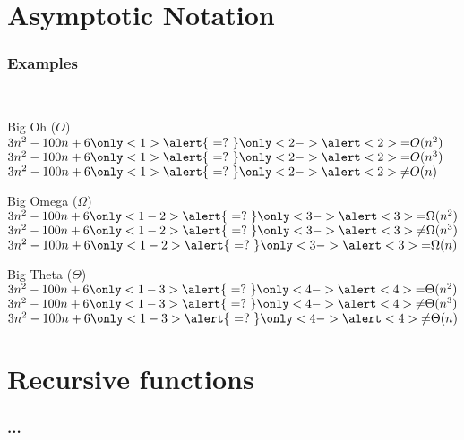 \documentclass[aspectratio=169]{beamer}
\begin{document}
\section{Asymptotic Notation}


\begin{frame}[t]\frametitle{Examples}
    ~\\[-8mm]
    \begin{block}{Big Oh ($O$)}
        $3n^2 -100n+6 \only<1>{\alert{~{=}?~}}\only<2->{\alert<2>{=   }} O(n^2)$
      \\$3n^2 -100n+6 \only<1>{\alert{~{=}?~}}\only<2->{\alert<2>{=   }} O(n^3)$
      \\$3n^2 -100n+6 \only<1>{\alert{~{=}?~}}\only<2->{\alert<2>{\neq}} O(n)$  
    \end{block}

    \begin{block}{Big Omega ($\Omega$)}
        $3n^2 -100n+6 \only<1-2>{\alert{~{=}?~}}\only<3->{\alert<3>{=   }} \Omega(n^2)$
      \\$3n^2 -100n+6 \only<1-2>{\alert{~{=}?~}}\only<3->{\alert<3>{\neq}} \Omega(n^3)$
      \\$3n^2 -100n+6 \only<1-2>{\alert{~{=}?~}}\only<3->{\alert<3>{=   }} \Omega(n)$  
    \end{block}

    \begin{block}{Big Theta ($\Theta$)}
        $3n^2 - 100n + 6 \only<1-3>{\alert{~{=}?~}}\only<4->{\alert<4>{=   }} \Theta(n^2)$
      \\$3n^2 - 100n + 6 \only<1-3>{\alert{~{=}?~}}\only<4->{\alert<4>{\neq}} \Theta(n^3)$
      \\$3n^2 - 100n + 6 \only<1-3>{\alert{~{=}?~}}\only<4->{\alert<4>{\neq}} \Theta(n)$  
    \end{block}

\end{frame}



\section{Recursive functions}

\begin{frame}[t]\frametitle{...}
    


\end{frame}
\end{document}
